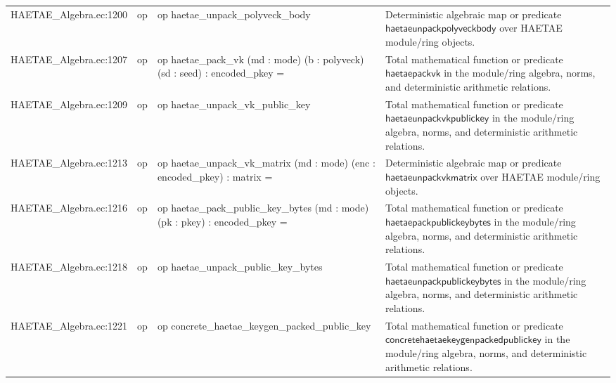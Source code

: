 \documentclass[10pt]{article}
\begin{document}
\begin{longtable}{L{0.11\textwidth}L{0.055\textwidth}L{0.385\textwidth}L{0.41\textwidth}}
HAETAE\_\allowbreak{}Algebra.\allowbreak{}ec:\allowbreak{}1200 & op & {\ttfamily\scriptsize op haetae\_\allowbreak{}unpack\_\allowbreak{}polyveck\_\allowbreak{}body} & Deterministic algebraic map or predicate $\mathsf{haetaeunpackpolyveckbody}$ over HAETAE module/ring objects. \\
HAETAE\_\allowbreak{}Algebra.\allowbreak{}ec:\allowbreak{}1207 & op & {\ttfamily\scriptsize op haetae\_\allowbreak{}pack\_\allowbreak{}vk (md : mode) (b : polyveck) (sd : seed) : encoded\_\allowbreak{}pkey =} & Total mathematical function or predicate $\mathsf{haetaepackvk}$ in the module/ring algebra, norms, and deterministic arithmetic relations. \\
HAETAE\_\allowbreak{}Algebra.\allowbreak{}ec:\allowbreak{}1209 & op & {\ttfamily\scriptsize op haetae\_\allowbreak{}unpack\_\allowbreak{}vk\_\allowbreak{}public\_\allowbreak{}key} & Total mathematical function or predicate $\mathsf{haetaeunpackvkpublickey}$ in the module/ring algebra, norms, and deterministic arithmetic relations. \\
HAETAE\_\allowbreak{}Algebra.\allowbreak{}ec:\allowbreak{}1213 & op & {\ttfamily\scriptsize op haetae\_\allowbreak{}unpack\_\allowbreak{}vk\_\allowbreak{}matrix (md : mode) (enc : encoded\_\allowbreak{}pkey) : matrix =} & Deterministic algebraic map or predicate $\mathsf{haetaeunpackvkmatrix}$ over HAETAE module/ring objects. \\
HAETAE\_\allowbreak{}Algebra.\allowbreak{}ec:\allowbreak{}1216 & op & {\ttfamily\scriptsize op haetae\_\allowbreak{}pack\_\allowbreak{}public\_\allowbreak{}key\_\allowbreak{}bytes (md : mode) (pk : pkey) : encoded\_\allowbreak{}pkey =} & Total mathematical function or predicate $\mathsf{haetaepackpublickeybytes}$ in the module/ring algebra, norms, and deterministic arithmetic relations. \\
HAETAE\_\allowbreak{}Algebra.\allowbreak{}ec:\allowbreak{}1218 & op & {\ttfamily\scriptsize op haetae\_\allowbreak{}unpack\_\allowbreak{}public\_\allowbreak{}key\_\allowbreak{}bytes} & Total mathematical function or predicate $\mathsf{haetaeunpackpublickeybytes}$ in the module/ring algebra, norms, and deterministic arithmetic relations. \\
HAETAE\_\allowbreak{}Algebra.\allowbreak{}ec:\allowbreak{}1221 & op & {\ttfamily\scriptsize op concrete\_\allowbreak{}haetae\_\allowbreak{}keygen\_\allowbreak{}packed\_\allowbreak{}public\_\allowbreak{}key} & Total mathematical function or predicate $\mathsf{concretehaetaekeygenpackedpublickey}$ in the module/ring algebra, norms, and deterministic arithmetic relations. \\

\end{longtable}
\end{document}
